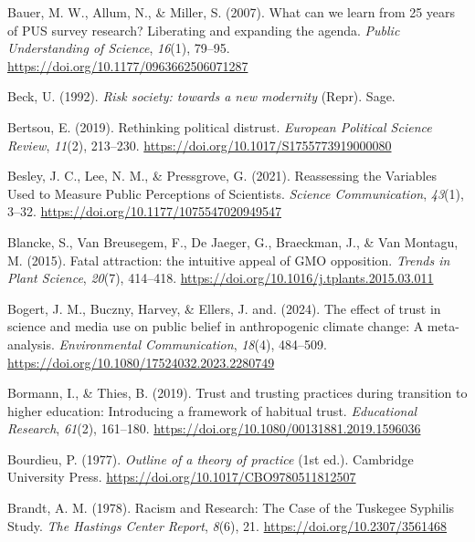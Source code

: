 \documentclass[
  jou,
  floatsintext,
  longtable,
  nolmodern,
  notxfonts,
  notimes,
  colorlinks=true,linkcolor=blue,citecolor=blue,urlcolor=blue]{apa7}
\newlength{\cslhangindent}
\newenvironment{CSLReferences}[2] %
 {\begin{list}{}{%
  \setlength{\itemindent}{0pt}
  \setlength{\leftmargin}{0pt}
  \setlength{\parsep}{0pt}
  \ifodd #1
   \setlength{\leftmargin}{\cslhangindent}
   \setlength{\itemindent}{-1\cslhangindent}
  \fi
  \setlength{\itemsep}{#2\baselineskip}}}
 {\end{list}}
\begin{document}
\begin{CSLReferences}{1}{0}
Bauer, M. W., Allum, N., \& Miller, S. (2007). What can we learn from 25
years of PUS survey research? Liberating and expanding the agenda.
\emph{Public Understanding of Science}, \emph{16}(1), 79--95.
\url{https://doi.org/10.1177/0963662506071287}

Beck, U. (1992). \emph{Risk society: towards a new modernity} (Repr).
Sage.

Bertsou, E. (2019). Rethinking political distrust. \emph{European
Political Science Review}, \emph{11}(2), 213--230.
\url{https://doi.org/10.1017/S1755773919000080}

Besley, J. C., Lee, N. M., \& Pressgrove, G. (2021). Reassessing the
Variables Used to Measure Public Perceptions of Scientists.
\emph{Science Communication}, \emph{43}(1), 3--32.
\url{https://doi.org/10.1177/1075547020949547}

Blancke, S., Van Breusegem, F., De Jaeger, G., Braeckman, J., \& Van
Montagu, M. (2015). Fatal attraction: the intuitive appeal of GMO
opposition. \emph{Trends in Plant Science}, \emph{20}(7), 414--418.
\url{https://doi.org/10.1016/j.tplants.2015.03.011}

Bogert, J. M., Buczny, Harvey, \& Ellers, J. and. (2024). The effect of
trust in science and media use on public belief in anthropogenic climate
change: A meta-analysis. \emph{Environmental Communication},
\emph{18}(4), 484--509.
\url{https://doi.org/10.1080/17524032.2023.2280749}

Bormann, I., \& Thies, B. (2019). Trust and trusting practices during
transition to higher education: Introducing a framework of habitual
trust. \emph{Educational Research}, \emph{61}(2), 161--180.
\url{https://doi.org/10.1080/00131881.2019.1596036}

Bourdieu, P. (1977). \emph{Outline of a theory of practice} (1st ed.).
Cambridge University Press.
\url{https://doi.org/10.1017/CBO9780511812507}

Brandt, A. M. (1978). Racism and Research: The Case of the Tuskegee
Syphilis Study. \emph{The Hastings Center Report}, \emph{8}(6), 21.
\url{https://doi.org/10.2307/3561468}


\end{CSLReferences}
\end{document}
